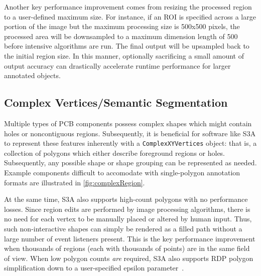 Another key performance improvement comes from resizing the processed region to a user-defined maximum size.
For instance, if an ROI is specified across a large portion of the image but the maximum processing size is 500x500 pixels, the processed area will be downsampled to a maximum dimension length of 500 before intensive algorithms are run.
The final output will be upsampled back to the initial region size.
In this manner, optionally sacrificing a small amount of output accuracy can drastically accelerate runtime performance for larger annotated objects.

\makeRegionEditFig

\subsection{Complex Vertices/Semantic Segmentation}
Multiple types of PCB components possess complex shapes which might contain holes or noncontiguous regions.
Subsequently, it is beneficial for software like S3A to represent these features inherently with a \texttt{ComplexXYVertices} object: that is, a collection of polygons which either describe foreground regions or holes.
Subsequently, any possible shape or shape grouping can be represented as needed.
Example components difficult to accomodate with single-polygon annotation formats are illustrated in \autoref{fig:complexRegion}.

\makeComplexRegionFig

At the same time, S3A also supports high-count polygons with no performance losses.
Since region edits are performed by image processing algorithms, there is no need for each vertex to be manually placed or altered by human input.
Thus, such non-interactive shapes can simply be rendered as a filled path without a large number of event listeners present.
This is the key performance improvement when thousands of regions (each with thousands of points) are in the same field of view.
When low polygon counts \emph{are} required, S3A also supports RDP polygon simplification down to a user-specified epsilon parameter~\cite{ramer_iterative_1972}.

